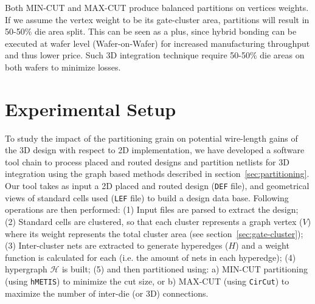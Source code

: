 \documentclass[conference]{IEEEtran}
\begin{document}
Both MIN-CUT and MAX-CUT produce balanced partitions on vertices weights. If we assume the vertex weight to be its gate-cluster area, partitions will result in 50-50\% die area split. This can be seen as a plus, since hybrid bonding can be executed at wafer level (Wafer-on-Wafer) for increased manufacturing throughput and thus lower price. Such 3D integration technique require 50-50\% die areas on both wafers to minimize losses.

\section{Experimental Setup}\label{sec:setup}
To study the impact of the partitioning grain on potential wire-length gains of the 3D design with respect to 2D implementation, we have developed a software tool chain to process placed and routed designs and partition netlists for 3D integration using the graph based methods described in section~\ref{sec:partitioning}. Our tool takes as input a 2D placed and routed design (\texttt{DEF} file), and geometrical views of standard cells used (\texttt{LEF} file) to build a design data base. Following operations are then performed: (1) Input files are parsed to extract the design; (2) Standard cells are clustered, so that each cluster represents a graph vertex ($V$) where its weight represents the total cluster area (see section~\ref{sec:gate-cluster}); (3) Inter-cluster nets are extracted to generate hyperedges ($H$) and a weight function is calculated for each (i.e. the amount of nets in each hyperedge); 
(4) hypergraph $\mathcal{H}$ is built; (5) and then partitioned using: a) MIN-CUT partitioning (using \texttt{hMETIS}) to minimize the cut size, or b) MAX-CUT (using \texttt{CirCut}) to maximize the number of inter-die (or 3D) connections.
\end{document}
